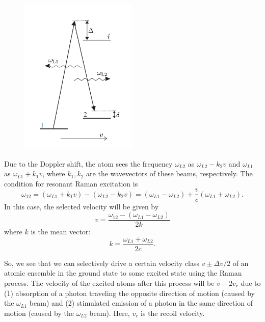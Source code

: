 \documentclass{book}
\theoremstyle{definition}
\newcommand{\f}[2]{\frac{#1}{#2}}
\begin{document}
\begin{figure}[!htb]
	\centering
	\includegraphics[width = 0.5\textwidth]{images/raman-velocity-selection}
\end{figure}

Due to the Doppler shift, the atom sees the frequency $\omega_{L2}$ as $\omega_{L2} - k_2v$ and $\omega_{L1}$ as $\omega_{L1} + k_1v$, where $k_1, k_2$ are the wavevectors of these beams, respectively. The condition for resonant Raman excitation is 
\begin{equation*}
\omega_{12} = (\omega_{L1} + k_1 v) - (\omega_{L2} - k_2 v) = (\omega_{L1} - \omega_{L2}) + \f{v}{c}(\omega_{L1} + \omega_{L2}).
\end{equation*}
In this case, the selected velocity will be given by 
\begin{equation*}
v = \f{\omega_{12} - (\omega_{L1} - \omega_{L2})}{2k}
\end{equation*}
where $k$ is the mean vector:
\begin{equation*}
k = \f{\omega_{L1} + \omega_{L2}}{2c}.
\end{equation*}

So, we see that we can selectively drive a certain velocity class $v \pm \Delta v/2$ of an atomic ensemble in the ground state to some excited state using the Raman process. The velocity of the excited atoms after this process will be $v - 2v_r$ due to (1) absorption of a photon traveling the opposite direction of motion (caused by the $\omega_{L1}$ beam) and (2) stimulated emission of a photon in the same direction of motion (caused by the $\omega_{L2}$ beam). Here, $v_r$ is the recoil velocity. \\
\end{document}

